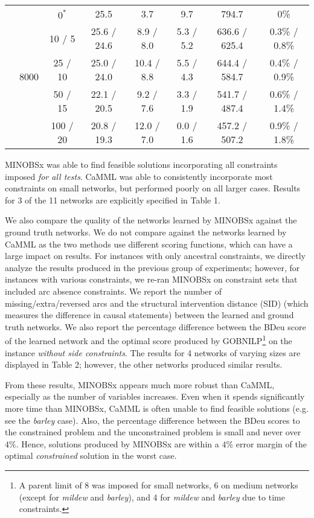 \documentclass[twoside,11pt]{article}
\begin{document}
\begin{table}[ht]
\begin{tabular}{ c | c | c || c | c | c | c | c  }
\hhline{~|-|-||-|-|-|-|-} 
& \multirow{5}{*}{8000}
& $0^*$ & 25.5 & 3.7 & 9.7 & 794.7 & 0\% \\
& & 10 / 5 & 25.6 / 24.6 & 8.9 / 8.0 & 5.3 / 5.2 & 636.6 / 625.4 & 0.3\% / 0.8\% \\
& & 25 / 10 & 25.0 / 24.0 & 10.4 / 8.8 & 5.5 / 4.3 & 644.4 / 584.7 & 0.4\% / 0.9\% \\
& & 50 / 15 & 22.1 / 20.5 & 9.2 / 7.6 & 3.3 / 1.9 & 541.7 / 487.4 & 0.6\% / 1.4\% \\
& & 100 / 20 & 20.8 / 19.3 & 12.0 / 7.0 & 0.0 / 1.6 & 457.2 / 507.2 & 0.9\% / 1.8\% \\

\end{tabular}
\end{table}

MINOBSx was able to find feasible solutions incorporating all constraints imposed \emph{for all tests}. CaMML was able to consistently incorporate most constraints on small networks,
but performed poorly on all larger cases. Results for 3 of the 11 networks are explicitly specified in Table 1. 

\smallskip
We also compare the quality of the networks learned by MINOBSx against the ground truth networks. We do not compare against the 
networks learned by CaMML as the two methods use different scoring functions, which can have a large impact on results. For instances with only ancestral constraints,
we directly analyze the results produced in the previous group of experiments; however, for instances with various constraints, we re-ran MINOBSx on constraint sets
that included arc absence constraints. 
We report the number of missing/extra/reversed arcs and the structural
intervention distance (SID) \citep{Peters2015} (which measures the difference in causal statements) between the learned and ground truth networks. We also report the percentage
difference between the BDeu score of the learned network and the optimal score produced by GOBNILP\footnote{A parent limit of 8 was imposed for small networks, 6 on medium networks (except for \emph{mildew} and \emph{barley}), and 4 for
\emph{mildew} and \emph{barley} due to time constraints.} on the instance \emph{without side constraints}. The results for 4 networks of varying sizes are displayed in Table 2; however, the other networks produced similar results. 

\smallskip
From these results, MINOBSx appears much more robust than CaMML, especially as the number of variables increases. Even when it spends significantly more time than
MINOBSx, CaMML is often unable to find feasible solutions (e.g. see the \emph{barley} case). Also, the percentage difference between
the BDeu scores to the constrained problem and the unconstrained problem is small and never over $4\%$.
Hence, solutions produced by MINOBSx are within a $4\%$ error margin of the optimal \emph{constrained} solution in the worst case. 
\end{document}
